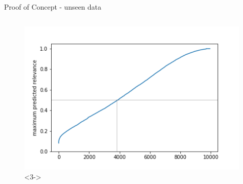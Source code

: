 \documentclass[9pt]{beamer}
\begin{document}
\begin{frame}{Proof of Concept - unseen data}
\begin{columns}
\begin{column}{0.382\linewidth}
		\begin{figure}
			\includegraphics[width=\linewidth]{../plots/maximum_predicted_relevance.png}<3->
		\end{figure}
	\end{column}
\end{columns}

\end{frame}
\end{document}
